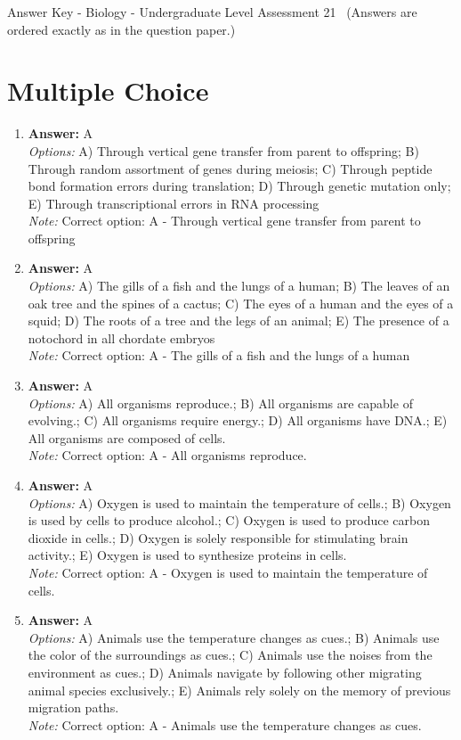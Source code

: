 \documentclass[12pt]{article}
\begin{document}
\begin{center}
Answer Key - Biology - Undergraduate Level Assessment 21 \
\small (Answers are ordered exactly as in the question paper.)
\end{center}

\section*{Multiple Choice}
\begin{enumerate}[label=\arabic*.]
\item \textbf{Answer:} A
\\ \textit{Options:} A) Through vertical gene transfer from parent to offspring; B) Through random assortment of genes during meiosis; C) Through peptide bond formation errors during translation; D) Through genetic mutation only; E) Through transcriptional errors in RNA processing
\\ \textit{Note:} Correct option: A - Through vertical gene transfer from parent to offspring
\item \textbf{Answer:} A
\\ \textit{Options:} A) The gills of a fish and the lungs of a human; B) The leaves of an oak tree and the spines of a cactus; C) The eyes of a human and the eyes of a squid; D) The roots of a tree and the legs of an animal; E) The presence of a notochord in all chordate embryos
\\ \textit{Note:} Correct option: A - The gills of a fish and the lungs of a human
\item \textbf{Answer:} A
\\ \textit{Options:} A) All organisms reproduce.; B) All organisms are capable of evolving.; C) All organisms require energy.; D) All organisms have DNA.; E) All organisms are composed of cells.
\\ \textit{Note:} Correct option: A - All organisms reproduce.
\item \textbf{Answer:} A
\\ \textit{Options:} A) Oxygen is used to maintain the temperature of cells.; B) Oxygen is used by cells to produce alcohol.; C) Oxygen is used to produce carbon dioxide in cells.; D) Oxygen is solely responsible for stimulating brain activity.; E) Oxygen is used to synthesize proteins in cells.
\\ \textit{Note:} Correct option: A - Oxygen is used to maintain the temperature of cells.
\item \textbf{Answer:} A
\\ \textit{Options:} A) Animals use the temperature changes as cues.; B) Animals use the color of the surroundings as cues.; C) Animals use the noises from the environment as cues.; D) Animals navigate by following other migrating animal species exclusively.; E) Animals rely solely on the memory of previous migration paths.
\\ \textit{Note:} Correct option: A - Animals use the temperature changes as cues.
\end{enumerate}
\end{document}
